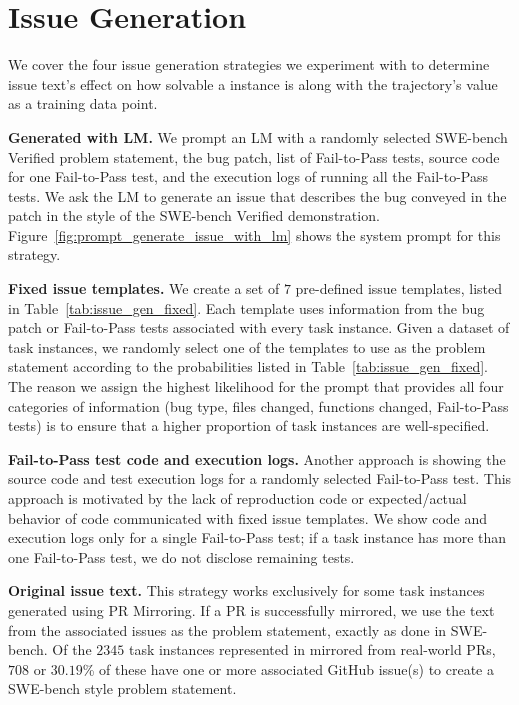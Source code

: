 \section{Issue Generation}
\label{appx:issue_generation}

We cover the four issue generation strategies we experiment with to determine issue text's effect on how solvable a \bugs{} instance is along with the trajectory's value as a training data point.

\textbf{Generated with LM.}
We prompt an LM with a randomly selected SWE-bench Verified problem statement, the bug patch, list of Fail-to-Pass tests, source code for one Fail-to-Pass test, and the execution logs of running all the Fail-to-Pass tests.
We ask the LM to generate an issue that describes the bug conveyed in the patch in the style of the SWE-bench Verified demonstration.
Figure~\ref{fig:prompt_generate_issue_with_lm} shows the system prompt for this strategy.

\textbf{Fixed issue templates.} We create a set of $7$ pre-defined issue templates, listed in Table~\ref{tab:issue_gen_fixed}.
Each template uses information from the bug patch or Fail-to-Pass tests associated with every task instance.
Given a dataset of task instances, we randomly select one of the templates to use as the problem statement according to the probabilities listed in Table~\ref{tab:issue_gen_fixed}.
The reason we assign the highest likelihood for the prompt that provides all four categories of information (bug type, files changed, functions changed, Fail-to-Pass tests) is to ensure that a higher proportion of task instances are well-specified.



\textbf{Fail-to-Pass test code and execution logs.} Another approach is showing the source code and test execution logs for a randomly selected Fail-to-Pass test.
This approach is motivated by the lack of reproduction code or expected/actual behavior of code communicated with fixed issue templates.
We show code and execution logs only for a single Fail-to-Pass test; if a task instance has more than one Fail-to-Pass test, we do not disclose remaining tests.

\textbf{Original issue text.}
This strategy works exclusively for some task instances generated using PR Mirroring.
If a PR is successfully mirrored, we use the text from the associated issues as the problem statement, exactly as done in SWE-bench.
Of the $2345$ task instances represented in \bugs{} mirrored from real-world PRs, $708$ or $30.19$\% of these have one or more associated GitHub issue(s) to create a SWE-bench style problem statement.

